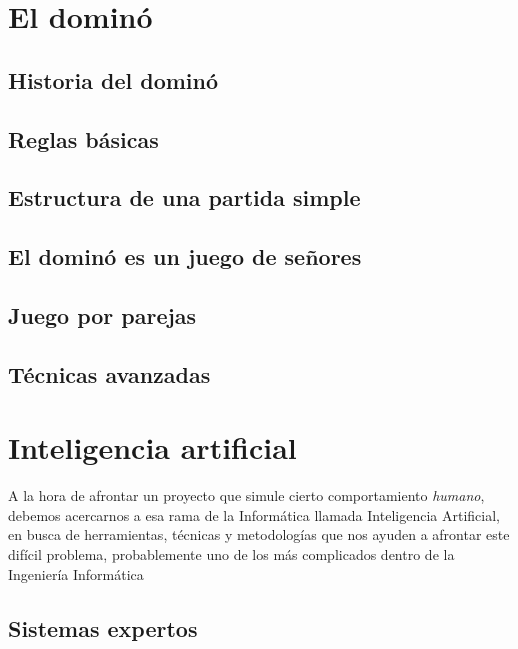 

\section{El dominó}

\subsection{Historia del dominó}

\subsection{Reglas básicas}
\subsection{Estructura de una partida simple}
\subsection{El dominó es un juego de señores}
\subsection{Juego por parejas}
\subsection{Técnicas avanzadas}

\section{Inteligencia artificial}

A la hora de afrontar un proyecto que simule cierto comportamiento \emph{humano}, debemos acercarnos a esa rama de la
Informática llamada Inteligencia Artificial, en busca de herramientas, técnicas y metodologías que nos ayuden a afrontar este
difícil problema, probablemente uno de los más complicados dentro de la Ingeniería Informática

\subsection{Sistemas expertos}

